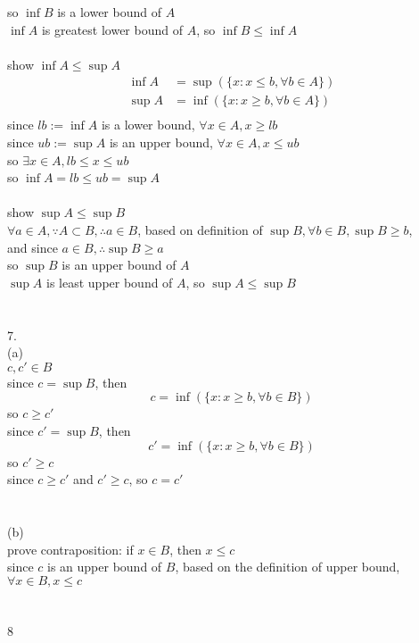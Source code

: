 \documentclass[12pt, border = 4pt, multi]{article} %
\begin{document}
so $\inf B$ is a lower bound of $A$\\
$\inf A$ is greatest lower bound of $A$, so $\inf B \leq \inf A$\\
\\
show $\inf A \leq \sup A$\\
\begin{align*}
\inf A &= \sup(\{x : x \leq b, \forall b \in A\})\\
\sup A &= \inf(\{x: x \geq b, \forall b \in A\})\\
\end{align*}
since $lb := \inf A$ is a lower bound, $\forall x \in A, x \geq lb$\\
since $ub := \sup A$ is an upper bound, $\forall x \in A, x \leq ub$\\
so $\exists x \in A, lb \leq x \leq ub$\\
so $\inf A = lb \leq ub = \sup A$\\
\\
show $\sup A \leq \sup B$\\
$\forall a \in A, \because A \subset B, \therefore a \in B$, based on definition of $\sup B, \forall b \in B, \sup B \geq b$,\\
and since $a \in B, \therefore \sup B \geq a$\\
so $\sup B$ is an upper bound of $A$\\
$\sup A$ is least upper bound of $A$, so $\sup A \leq \sup B$
\\
\\
\\
7.\\
(a)\\
$c, c' \in B$\\
since $c = \sup B$, then
\[c = \inf(\{x: x \geq b, \forall b \in B\})\]
so $c \geq c'$\\
since $c' = \sup B$, then
\[c' = \inf(\{x: x \geq b, \forall b \in B\})\]
so $c' \geq c$\\
since $c \geq c'$ and $c' \geq c$, so $c = c'$\\
\\
\\
(b)\\
prove contraposition: if $x \in B$, then $x \leq c$\\
since $c$ is an upper bound of $B$, based on the definition of upper bound, $\forall x \in B, x \leq c$\\
\\
\\
8\\
\end{document}
